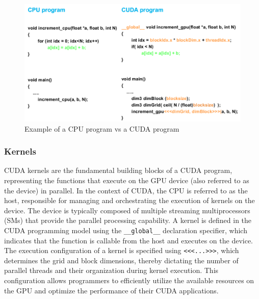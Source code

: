 \begin{figure}[htb]
    \centering
    \includegraphics[width=0.85\linewidth]{Figures/CPUvsGPUprogram.png}
    \caption{Example of a CPU program vs a CUDA program}
    \label{fig:cpuvsgpupro}
\end{figure}

\subsubsection{Kernels}
\label{sec:kernels}
CUDA kernels are the fundamental building blocks of a CUDA program, representing the functions 
that execute on the GPU device (also referred to as the device) in parallel. In the context of 
CUDA, the CPU is referred to as the host, responsible for managing and orchestrating the execution 
of kernels on the device\cite{marccudaslides}. The device is typically composed of multiple streaming multiprocessors 
(SMs) that provide the parallel processing capability. A kernel is defined in the CUDA programming 
model using the \texttt{__global__} declaration specifier, which indicates that the function is callable 
from the host and executes on the device. The execution configuration of a kernel is specified 
using \texttt{<<<...>>>}, which determines the grid and block dimensions, 
thereby dictating the number of parallel threads and their organization during kernel execution\cite{cuda2016best}. 
This configuration allows programmers to efficiently utilize the available resources on the GPU 
and optimize the performance of their CUDA applications.

